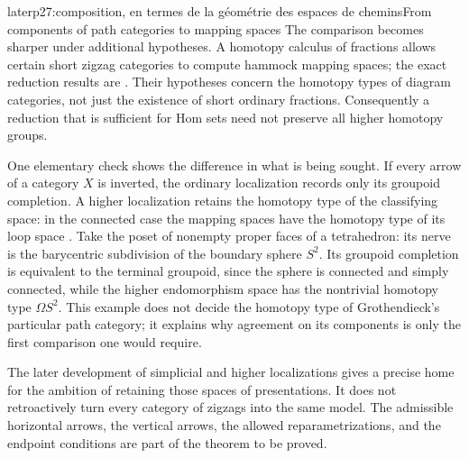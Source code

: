 \begin{dcomment}{later}{p27:composition, en termes de la géométrie des espaces de chemins}{From components of path categories to mapping spaces}
The comparison becomes sharper under additional hypotheses. A homotopy calculus of fractions allows certain short zigzag categories to compute hammock mapping spaces; the exact reduction results are \citet[Proposition~6.2]{DwyerKan1980Calculating}. Their hypotheses concern the homotopy types of diagram categories, not just the existence of short ordinary fractions. Consequently a reduction that is sufficient for Hom sets need not preserve all higher homotopy groups.

One elementary check shows the difference in what is being sought. If every arrow of a category $X$ is inverted, the ordinary localization records only its groupoid completion. A higher localization retains the homotopy type of the classifying space: in the connected case the mapping spaces have the homotopy type of its loop space \citep[\S5.5]{DwyerKan1980Simplicial}. Take the poset of nonempty proper faces of a tetrahedron: its nerve is the barycentric subdivision of the boundary sphere $S^2$. Its groupoid completion is equivalent to the terminal groupoid, since the sphere is connected and simply connected, while the higher endomorphism space has the nontrivial homotopy type $\Omega S^2$. This example does not decide the homotopy type of Grothendieck's particular path category; it explains why agreement on its components is only the first comparison one would require.

The later development of simplicial and higher localizations gives a precise home for the ambition of retaining those spaces of presentations. It does not retroactively turn every category of zigzags into the same model. The admissible horizontal arrows, the vertical arrows, the allowed reparametrizations, and the endpoint conditions are part of the theorem to be proved.
\end{dcomment}



